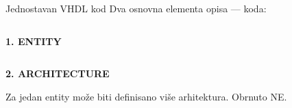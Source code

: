 \begin{frame}[label=07-s021]{Jednostavan VHDL kod}
\setlength{\parskip}{0pt}\lstset{aboveskip=1pt,belowskip=1pt}
Dva osnovna elementa opisa — koda:
\par\vspace{1mm}
\begin{columns}[c,onlytextwidth]
\centering
{}\textcolor{DEcrvena}{\textbf{1. ENTITY}}\par\vspace{1mm}

\end{columns}
\par\vspace{1mm}
\textcolor{DEcrvena}{\textbf{2. ARCHITECTURE}}\par\vspace{1mm}

\par\vspace{1mm}
\centering Za jedan entity može biti definisano više arhitektura. Obrnuto NE.
\end{frame}
